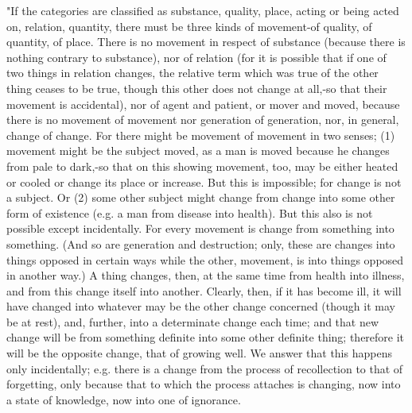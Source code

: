 "If the categories are classified as substance, quality, place, acting
or being acted on, relation, quantity, there must be three kinds of
movement-of quality, of quantity, of place. There is no movement in
respect of substance (because there is nothing contrary to substance),
nor of relation (for it is possible that if one of two things in relation
changes, the relative term which was true of the other thing ceases
to be true, though this other does not change at all,-so that their
movement is accidental), nor of agent and patient, or mover and moved,
because there is no movement of movement nor generation of generation,
nor, in general, change of change. For there might be movement of
movement in two senses; (1) movement might be the subject moved, as
a man is moved because he changes from pale to dark,-so that on this
showing movement, too, may be either heated or cooled or change its
place or increase. But this is impossible; for change is not a subject.
Or (2) some other subject might change from change into some other
form of existence (e.g. a man from disease into health). But this
also is not possible except incidentally. For every movement is change
from something into something. (And so are generation and destruction;
only, these are changes into things opposed in certain ways while
the other, movement, is into things opposed in another way.) A thing
changes, then, at the same time from health into illness, and from
this change itself into another. Clearly, then, if it has become ill,
it will have changed into whatever may be the other change concerned
(though it may be at rest), and, further, into a determinate change
each time; and that new change will be from something definite into
some other definite thing; therefore it will be the opposite change,
that of growing well. We answer that this happens only incidentally;
e.g. there is a change from the process of recollection to that of
forgetting, only because that to which the process attaches is changing,
now into a state of knowledge, now into one of ignorance.

